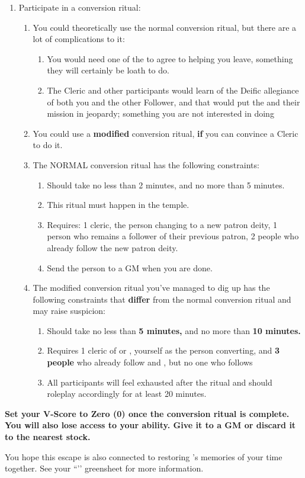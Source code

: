 \documentclass[green]{GL2020}
\begin{document}
\begin{enumerate}
  \item Participate in a conversion ritual:
  \begin{enumerate}
    \item You could theoretically use the normal conversion ritual, but there are a lot of complications to it:
    \begin{enumerate}
      \item You would need one of the \pGoaties{} to agree to helping you leave, something they will certainly be loath to do.
      \item The Cleric and other participants would learn of the Deific allegiance of both you and the other Follower, and that would put the \pGoaties{} and their mission in jeopardy; something you are not interested in doing
    \end{enumerate}

    \item You could use a \textbf{modified} conversion ritual, \textbf{if} you can convince a Cleric to do it. 
     \item The NORMAL conversion ritual has the following constraints: 
  \begin{enumerate}
    \item Should take no less than 2 minutes, and no more than 5 minutes.
    \item This ritual must happen in the temple.
    \item Requires: 1 cleric, the person changing to a new patron deity, 1 person who remains a follower of their previous patron, 2 people who already follow the new patron deity.
	\item Send the person to a GM when you are done.
  \end{enumerate}
     \item The modified conversion ritual you’ve managed to dig up has the following constraints that \textbf{differ} from the normal conversion ritual and may raise suspicion:
    \begin{enumerate}
\item Should take no less than \textbf{5 minutes,} and no more than \textbf{10 minutes.} 
\item Requires 1 cleric of \cEbb{} or \cFlow{}, yourself as the person converting, and \textbf{3 people} who already follow \cEbb{} and \cFlow{}, but no one who follows \cGenesis{}
      \item All participants will feel exhausted after the ritual and should roleplay accordingly for at least 20 minutes.
    \end{enumerate}
  \end{enumerate}
\end{enumerate}

\textbf{Set your V-Score to Zero (0) once the conversion ritual is complete. You will also lose access to your \aLuck{} ability. Give it to a GM or discard it to the nearest stock.}

You hope this escape is also connected to restoring \cHeadScientist{}’s memories of your time together. See your ``\gRestoringLove{}’’ greensheet for more information.
\end{document}
